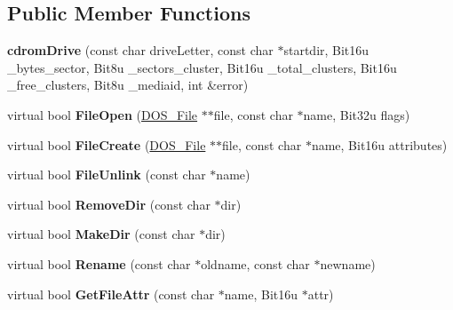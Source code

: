 \subsection*{Public Member Functions}
\begin{DoxyCompactItemize}
\item 
\hypertarget{classcdromDrive_a9bc77d75fc8e02d73586ad909cc4fd86}{{\bfseries cdrom\-Drive} (const char drive\-Letter, const char $\ast$startdir, Bit16u \-\_\-bytes\-\_\-sector, Bit8u \-\_\-sectors\-\_\-cluster, Bit16u \-\_\-total\-\_\-clusters, Bit16u \-\_\-free\-\_\-clusters, Bit8u \-\_\-mediaid, int \&error)}\label{classcdromDrive_a9bc77d75fc8e02d73586ad909cc4fd86}

\item 
\hypertarget{classcdromDrive_aa5ff41c5c9c045550b6f1a0974aa8d1d}{virtual bool {\bfseries File\-Open} (\hyperlink{classDOS__File}{D\-O\-S\-\_\-\-File} $\ast$$\ast$file, const char $\ast$name, Bit32u flags)}\label{classcdromDrive_aa5ff41c5c9c045550b6f1a0974aa8d1d}

\item 
\hypertarget{classcdromDrive_ac7c844b8ced8b687886f1fa5e6b9c5e4}{virtual bool {\bfseries File\-Create} (\hyperlink{classDOS__File}{D\-O\-S\-\_\-\-File} $\ast$$\ast$file, const char $\ast$name, Bit16u attributes)}\label{classcdromDrive_ac7c844b8ced8b687886f1fa5e6b9c5e4}

\item 
\hypertarget{classcdromDrive_a0e4ec60ab003c1cc1b687bc2ddef9d8a}{virtual bool {\bfseries File\-Unlink} (const char $\ast$name)}\label{classcdromDrive_a0e4ec60ab003c1cc1b687bc2ddef9d8a}

\item 
\hypertarget{classcdromDrive_ae5a43f4860af4338c8efe8102489ede2}{virtual bool {\bfseries Remove\-Dir} (const char $\ast$dir)}\label{classcdromDrive_ae5a43f4860af4338c8efe8102489ede2}

\item 
\hypertarget{classcdromDrive_a6a8f1604c680ab386f60d777f248eb78}{virtual bool {\bfseries Make\-Dir} (const char $\ast$dir)}\label{classcdromDrive_a6a8f1604c680ab386f60d777f248eb78}

\item 
\hypertarget{classcdromDrive_abf672051a5e5e3b4637f4f976ed0c6cb}{virtual bool {\bfseries Rename} (const char $\ast$oldname, const char $\ast$newname)}\label{classcdromDrive_abf672051a5e5e3b4637f4f976ed0c6cb}

\item 
\hypertarget{classcdromDrive_aba4f6b7a2df7be93c754232dff50c23c}{virtual bool {\bfseries Get\-File\-Attr} (const char $\ast$name, Bit16u $\ast$attr)}\label{classcdromDrive_aba4f6b7a2df7be93c754232dff50c23c}


\end{DoxyCompactItemize}
